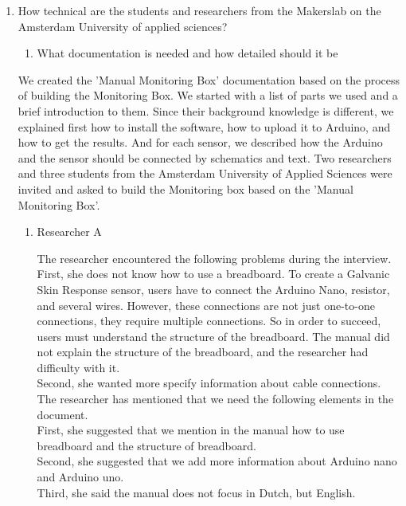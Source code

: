 \documentclass[conference]{IEEEtran}
\begin{document}
		\begin{enumerate}
			\item How technical are the students and researchers from the Makerslab on the Amsterdam University of applied sciences?
				\begin{enumerate}
					\item What documentation is needed and how detailed should it be
				\end{enumerate}

				We created the 'Manual Monitoring Box' documentation based on the process of building the Monitoring Box. We started with a list of parts we used and a brief introduction to them. Since their background knowledge is different, we explained first how to install the software, how to upload it to Arduino, and how to get the results. And for each sensor, we described how the Arduino and the sensor should be connected by schematics and text. Two researchers and three students from the Amsterdam University of Applied Sciences were invited and asked to build the Monitoring box based on the 'Manual Monitoring Box'. \\
				\begin{enumerate}
					\item Researcher A

						The researcher encountered the following problems during the interview.\\

						First, she does not know how to use a breadboard. To create a Galvanic Skin Response sensor, users have to connect the Arduino Nano, resistor, and several wires. However, these connections are not just one-to-one connections, they require multiple connections. So in order to succeed, users must understand the structure of the breadboard. The manual did not explain the structure of the breadboard, and the researcher had difficulty with it.\\
						Second, she wanted more specify information about cable connections.\\
		 		
						The researcher has mentioned that we need the following elements in the document.\\

						First, she suggested that we mention in the manual how to use breadboard and the structure of breadboard. \\
						Second, she suggested that we add more information about Arduino nano and Arduino uno.\\
						Third, she said the manual does not focus in Dutch, but English. \\
		

\end{enumerate}
\end{enumerate}
\end{document}
